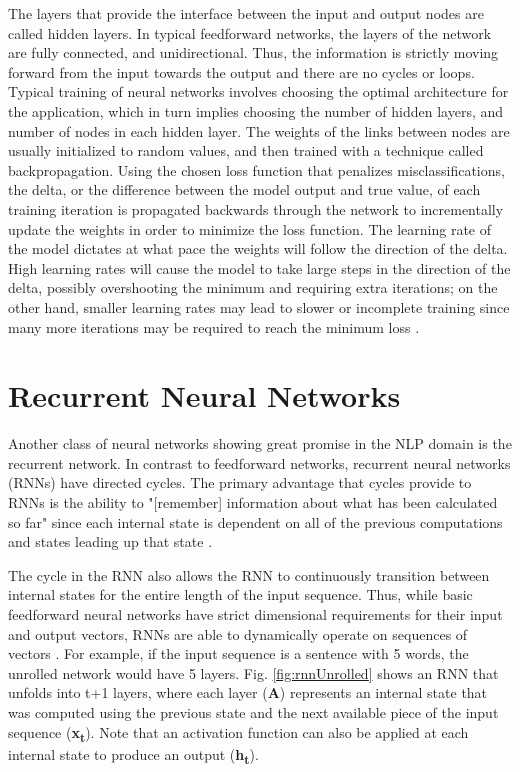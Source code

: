 The layers that provide the interface between the input and output nodes are called hidden layers.  In typical feedforward networks, the layers of the network are fully connected, and unidirectional.  Thus, the information is strictly moving forward from the input towards the output and there are no cycles or loops.  Typical training of neural networks involves choosing the optimal architecture for the application, which in turn implies choosing the number of hidden layers, and number of nodes in each hidden layer.  The weights of the links between nodes are usually initialized to random values, and then trained with a technique called backpropagation.  Using the chosen loss function that penalizes misclassifications, the delta, or the difference between the model output and true value, of each training iteration is propagated backwards through the network to incrementally update the weights in order to minimize the loss function.  The learning rate of the model dictates at what pace the weights will follow the direction of the delta.  High learning rates will cause the model to take large steps in the direction of the delta, possibly overshooting the minimum and requiring extra iterations; on the other hand, smaller learning rates may lead to slower or incomplete training since many more iterations may be required to reach the minimum loss \cite{neuralNetsNLP}.


\section{Recurrent Neural Networks} \label{rnnSection}

Another class of neural networks showing great promise in the NLP domain is the recurrent network.  In contrast to feedforward networks, recurrent neural networks (RNNs) have directed cycles.  The primary advantage that cycles provide to RNNs is the ability to "[remember] information about what has been calculated so far" since each internal state is dependent on all of the previous computations and states leading up that state \cite{introRNN}.

The cycle in the RNN also allows the RNN to continuously transition between internal states for the entire length of the input sequence.  Thus, while basic feedforward neural networks have strict dimensional requirements for their input and output vectors, RNNs are able to dynamically operate on sequences of vectors \cite{rnn}.  For example, if the input sequence is a sentence with 5 words, the unrolled network would have 5 layers.  Fig. \ref{fig:rnnUnrolled} shows an RNN that unfolds into t+1 layers, where each layer (\textbf{A}) represents an internal state that was computed using the previous state and the next available piece of the input sequence (\textbf{x\textsubscript{t}}).  Note that an activation function can also be applied at each internal state to produce an output (\textbf{h\textsubscript{t}}).


